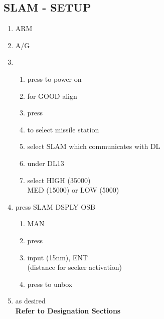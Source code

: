 \documentclass[fontInter, widesubsec]{TechCheck}
\begin{document}
	\subsection{SLAM - SETUP}
	\label{subsec:84setup}
	\begin{enumerate}
		\item {}\dotfill ARM
		\item {}\dotfill A/G
		\item {}
		\begin{enumerate}
			\item {}\dotfill press to power on
			\item {}\dotfill for GOOD align
			\item {}\dotfill press
			\item {}\dotfill to select missile station
			\item {}\dotfill select SLAM  which communicates with DL
			\item {}\dotfill under DL13
			\item {}\dotfill select HIGH (35000) \\
			\hfill MED (15000) or LOW (5000)
		\end{enumerate}
		\item {}\dotfill press SLAM DSPLY OSB
		\begin{enumerate}
			\item {}\dotfill MAN
			\item {}\dotfill press
			\item {}\dotfill input (15nm), ENT \\
			\hfill (distance for seeker activation)
			\item {}\dotfill press to unbox
		\end{enumerate}
		\item {}\dotfill as desired \\
		\hfill \textbf{Refer to Designation Sections}
	\end{enumerate}
\end{document}

